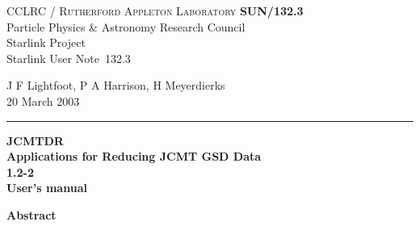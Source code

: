 \documentclass[twoside,11pt]{article}
\newcommand{\stardoccategory}  {Starlink User Note}
\newcommand{\stardocinitials}  {SUN}
\newcommand{\stardocnumber}    {132.3}
\newcommand{\stardocauthors}
   {J F Lightfoot, P A Harrison, H Meyerdierks}
\newcommand{\stardocdate}      {20 March 2003}
\newcommand{\stardoctitle}     {JCMTDR \\[2ex] Applications for Reducing JCMT GSD Data}
\newcommand{\stardocversion}   {1.2-2}
\newcommand{\stardocmanual}    {User's manual}
\newcommand{\stardocname}{\stardocinitials /\stardocnumber}
\newenvironment{latexonly}{}{}
\renewcommand{\_}{\texttt{\symbol{95}}}
\begin{document}
\thispagestyle{empty}

\begin{latexonly}
   CCLRC / \textsc{Rutherford Appleton Laboratory} \hfill \textbf{\stardocname}\\
   {\large Particle Physics \& Astronomy Research Council}\\
   {\large Starlink Project\\}
   {\large \stardoccategory\ \stardocnumber}
   \begin{flushright}
   \stardocauthors\\
   \stardocdate
   \end{flushright}
   \vspace{-4mm}
   \rule{\textwidth}{0.5mm}
   \vspace{5mm}
   \begin{center}
   {\Huge\textbf{\stardoctitle \\ [2.5ex]}}
   {\LARGE\textbf{\stardocversion \\ [4ex]}}
   {\Huge\textbf{\stardocmanual}}
   \end{center}
   \vspace{5mm}



   \vspace{10mm}
   \begin{center}
      {\Large\textbf{Abstract}}
   \end{center}
\end{latexonly}
\end{document}
